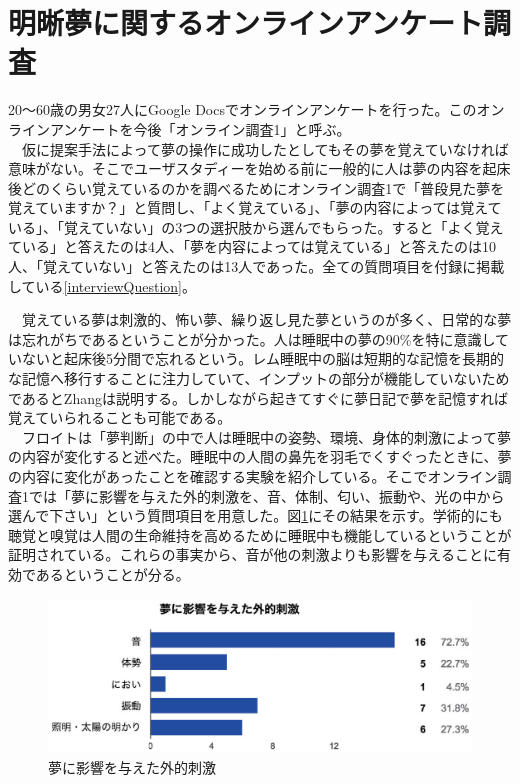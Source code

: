 \section{明晰夢に関するオンラインアンケート調査}
20〜60歳の男女27人にGoogle Docsでオンラインアンケートを行った。このオンラインアンケートを今後「オンライン調査1」と呼ぶ。\\
　仮に提案手法によって夢の操作に成功したとしてもその夢を覚えていなければ意味がない。そこでユーザスタディーを始める前に一般的に人は夢の内容を起床後どのくらい覚えているのかを調べるためにオンライン調査1で「普段見た夢を覚えていますか？」と質問し、「よく覚えている」、「夢の内容によっては覚えている」、「覚えていない」の3つの選択肢から選んでもらった。すると「よく覚えている」と答えたのは4人、「夢を内容によっては覚えている」と答えたのは10人、「覚えていない」と答えたのは13人であった。全ての質問項目を付録に掲載している\ref{interviewQuestion}。

　覚えている夢は刺激的、怖い夢、繰り返し見た夢というのが多く、日常的な夢は忘れがちであるということが分かった。人は睡眠中の夢の90\%を特に意識していないと起床後5分間で忘れるという。レム睡眠中の脳は短期的な記憶を長期的な記憶へ移行することに注力していて、インプットの部分が機能していないためであるとZhangは説明する\cite{Zhang}。しかしながら起きてすぐに夢日記で夢を記憶すれば覚えていられることも可能である\cite{forgetDreams}。\\
　フロイトは「夢判断」の中で人は睡眠中の姿勢、環境、身体的刺激によって夢の内容が変化すると述べた\cite{freud}。睡眠中の人間の鼻先を羽毛でくすぐったときに、夢の内容に変化があったことを確認する実験を紹介している。そこでオンライン調査1では「夢に影響を与えた外的刺激を、音、体制、匂い、振動や、光の中から選んで下さい」という質問項目を用意した。図\ref{externalShigeki}にその結果を示す。学術的にも聴覚と嗅覚は人間の生命維持を高めるために睡眠中も機能しているということが証明されている\cite{Zhang}。これらの事実から、音が他の刺激よりも影響を与えることに有効であるということが分る。\\

\begin{figure}[htbp]
\begin{center}
\includegraphics[width=15cm]{eps/input.eps}
\caption{夢に影響を与えた外的刺激}
\label{externalShigeki}
\end{center}
\end{figure}

